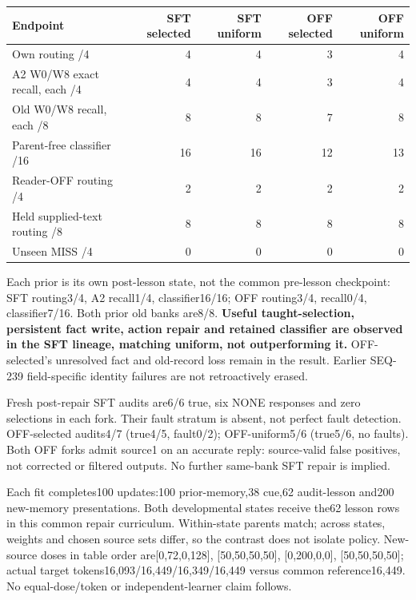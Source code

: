 \documentclass[11pt]{article}
\begin{document}
\begin{center}
\small
\begin{tabular}{lrrrr}
\toprule
Endpoint & SFT selected & SFT uniform & OFF selected & OFF uniform \\
\midrule
Own routing /4 & 4 & 4 & 3 & 4 \\
A2 W0/W8 exact recall, each /4 & 4 & 4 & 3 & 4 \\
Old W0/W8 recall, each /8 & 8 & 8 & 7 & 8 \\
Parent-free classifier /16 & 16 & 16 & 12 & 13 \\
Reader-OFF routing /4 & 2 & 2 & 2 & 2 \\
Held supplied-text routing /8 & 8 & 8 & 8 & 8 \\
Unseen MISS /4 & 0 & 0 & 0 & 0 \\
\bottomrule
\end{tabular}
\end{center}

Each prior is its own post-lesson state, not the common pre-lesson checkpoint:
SFT routing3/4, A2 recall1/4, classifier16/16; OFF routing3/4, recall0/4,
classifier7/16. Both prior old banks are8/8. \textbf{Useful taught-selection,
persistent fact write, action repair and retained classifier are observed in
the SFT lineage, matching uniform, not outperforming it.} OFF-selected's
unresolved fact and old-record loss remain in the result. Earlier SEQ-239
field-specific identity failures are not retroactively erased.

Fresh post-repair SFT audits are6/6 true, six NONE responses and zero selections
in each fork. Their fault stratum is absent, not perfect fault detection.
OFF-selected audits4/7 (true4/5, fault0/2); OFF-uniform5/6 (true5/6, no faults).
Both OFF forks admit source1 on an accurate reply: source-valid false positives,
not corrected or filtered outputs. No further same-bank SFT repair is implied.

Each fit completes100 updates:100 prior-memory,38 cue,62 audit-lesson and200
new-memory presentations. Both developmental states receive the62 lesson rows
in this common repair curriculum. Within-state parents match; across states,
weights and chosen source sets differ, so the contrast does not isolate policy.
New-source doses in table order are[0,72,0,128], [50,50,50,50], [0,200,0,0],
[50,50,50,50]; actual target tokens16,093/16,449/16,349/16,449 versus common
reference16,449. No equal-dose/token or independent-learner claim follows.
\end{document}
